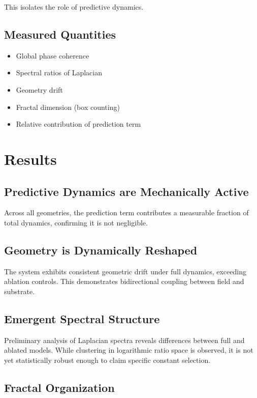 \documentclass[twocolumn]{article}
\begin{document}
This isolates the role of predictive dynamics.

\subsection{Measured Quantities}

\begin{itemize}
\item Global phase coherence
\item Spectral ratios of Laplacian
\item Geometry drift
\item Fractal dimension (box counting)
\item Relative contribution of prediction term
\end{itemize}

\section{Results}

\subsection{Predictive Dynamics are Mechanically Active}

Across all geometries, the prediction term contributes a measurable fraction of total dynamics, confirming it is not negligible.

\subsection{Geometry is Dynamically Reshaped}

The system exhibits consistent geometric drift under full dynamics, exceeding ablation controls. This demonstrates bidirectional coupling between field and substrate.

\subsection{Emergent Spectral Structure}

Preliminary analysis of Laplacian spectra reveals differences between full and ablated models. While clustering in logarithmic ratio space is observed, it is not yet statistically robust enough to claim specific constant selection.

\subsection{Fractal Organization}
\end{document}
